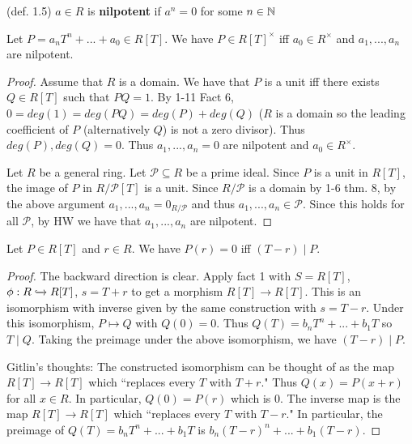 \begin{rmk} (def. 1.5)
$a \in R$ is \textbf{nilpotent} if $a^n = 0$ for some $n \in \mathbb{N}$
\end{rmk}

\begin{prop}
Let $P = a_nT^n + ... + a_0 \in R[T]$.  We have $P \in R[T]^\times$ iff $a_0 \in R^\times$ and $a_1,...,a_n$ are nilpotent.
\end{prop}

\begin{proof} \hspace{0.5cm}

Assume that $R$ is a domain.  We have that $P$ is a unit iff there exists $Q \in R[T]$ such that $PQ = 1$.  By 1-11 Fact 6, $0 = deg(1) = deg(PQ) = deg(P) + deg(Q)$ ($R$ is a domain so the leading coefficient of $P$ (alternatively $Q$) is not a zero divisor).  Thus $deg(P),deg(Q) = 0$.  Thus $a_1,...,a_n = 0$ are nilpotent and $a_0 \in R^\times$.

Let $R$ be a general ring.  Let $\mathcal{P} \subseteq R$ be a prime ideal.  Since $P$ is a unit in $R[T]$, the image of $P$ in $R / \mathcal{P}[T]$ is a unit.  Since $R/\mathcal{P}$ is a domain by 1-6 thm. 8, by the above argument $a_1,...,a_n = 0_{R/\mathcal{P}}$ and thus $a_1,...,a_n \in \mathcal{P}$.  Since this holds for all $\mathcal{P}$, by HW we have that $a_1,...,a_n$ are nilpotent.

\end{proof}

\begin{lemma}
Let $P \in R[T]$ and $r \in R$.  We have $P(r) = 0$ iff $(T-r) \mid P$.
\end{lemma}

\begin{proof}

The backward direction is clear.  Apply fact 1 with $S = R[T]$, $\phi : R \xhookrightarrow{} R[T]$, $s = T+r$ to get a morphism $R[T] \rightarrow R[T]$.  This is an isomorphism with inverse given by the same construction with $s = T-r$.  Under this isomorphism, $P \mapsto Q$ with $Q(0) = 0$.  Thus $Q(T) = b_nT^n + ... + b_1T$ so $T \mid Q$.  Taking the preimage under the above isomorphism, we have $(T-r) \mid P$.

Gitlin's thoughts:  The constructed isomorphism can be thought of as the map $R[T] \rightarrow R[T]$ which ``replaces every $T$ with $T+r$."  Thus $Q(x) = P(x+r)$ for all $x \in R$.  In particular, $Q(0) = P(r)$ which is $0$.  The inverse map is the map $R[T] \rightarrow R[T]$ which ``replaces every $T$ with $T-r$."  In particular, the preimage of $Q(T) = b_nT^n + ... + b_1T$ is $b_n(T-r)^n + ... + b_1(T-r)$.

\end{proof}

